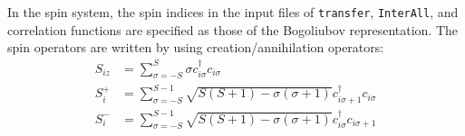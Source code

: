 In the spin system,
the spin indices in the input files of \verb|transfer|, \verb|InterAll|,
and correlation functions are specified as those of the Bogoliubov representation.
The spin operators are written by using creation/annihilation operators:
\begin{align}
  S_{i z} &= \sum_{\sigma = -S}^{S} \sigma c_{i \sigma}^\dagger c_{i \sigma}
  \\
  S_{i}^+ &= \sum_{\sigma = -S}^{S-1} 
  \sqrt{S(S+1) - \sigma(\sigma+1)} 
  c_{i \sigma+1}^\dagger c_{i \sigma}
  \\
  S_{i}^- &= \sum_{\sigma = -S}^{S-1} 
  \sqrt{S(S+1) - \sigma(\sigma+1)} 
  c_{i \sigma}^\dagger c_{i \sigma+1}
\end{align}

